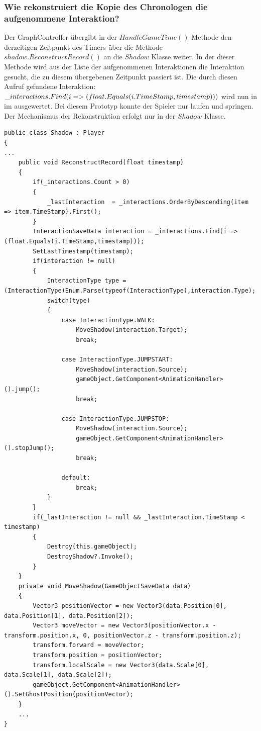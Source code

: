 \subsubsection{Wie rekonstruiert die Kopie des Chronologen die aufgenommene Interaktion?}\label{sec:good_04}
Der GraphController übergibt in der $HandleGameTime()$ Methode den derzeitigen Zeitpunkt des Timers über die Methode $ shadow.ReconstructRecord()$ an die $Shadow$ Klasse weiter. In der dieser Methode wird aus der Liste der aufgenommenen Interaktionen die Interaktion gesucht, die zu diesem übergebenen Zeitpunkt passiert ist. Die durch diesen Aufruf gefundene Interaktion: $\_interactions.Find(i => \\(float.Equals(i.TimeStamp,timestamp)))$ wird nun in im  ausgewertet. Bei diesem Prototyp konnte der Spieler nur laufen und springen.
Der Mechanismus der Rekonstruktion erfolgt nur in der $Shadow$ Klasse.
\begin{lstlisting}[caption={Rekonstruktionsmethode aus der Shadow.cs}, label={sec:reconstructing_old}]
public class Shadow : Player
{ 
...
    public void ReconstructRecord(float timestamp)
    {
        if(_interactions.Count > 0)
        {
            _lastInteraction  = _interactions.OrderByDescending(item => item.TimeStamp).First();
        }
        InteractionSaveData interaction = _interactions.Find(i => (float.Equals(i.TimeStamp,timestamp)));
        SetLastTimestamp(timestamp);
        if(interaction != null)
        {
            InteractionType type = (InteractionType)Enum.Parse(typeof(InteractionType),interaction.Type);
            switch(type)
            {
                case InteractionType.WALK:
                    MoveShadow(interaction.Target);
                    break;

                case InteractionType.JUMPSTART:
                    MoveShadow(interaction.Source);
                    gameObject.GetComponent<AnimationHandler>().jump();
                    break;

                case InteractionType.JUMPSTOP:
                    MoveShadow(interaction.Source);
                    gameObject.GetComponent<AnimationHandler>().stopJump();
                    break;

                default:
                    break;
            }
        }
        if(_lastInteraction != null && _lastInteraction.TimeStamp < timestamp)
        {
            Destroy(this.gameObject);
            DestroyShadow?.Invoke();
        }
    }
    private void MoveShadow(GameObjectSaveData data)
    {
        Vector3 positionVector = new Vector3(data.Position[0], data.Position[1], data.Position[2]);
        Vector3 moveVector = new Vector3(positionVector.x - transform.position.x, 0, positionVector.z - transform.position.z);
        transform.forward = moveVector;
        transform.position = positionVector;
        transform.localScale = new Vector3(data.Scale[0], data.Scale[1], data.Scale[2]);
        gameObject.GetComponent<AnimationHandler>().SetGhostPosition(positionVector);
    }
    ...
}
\end{lstlisting}

